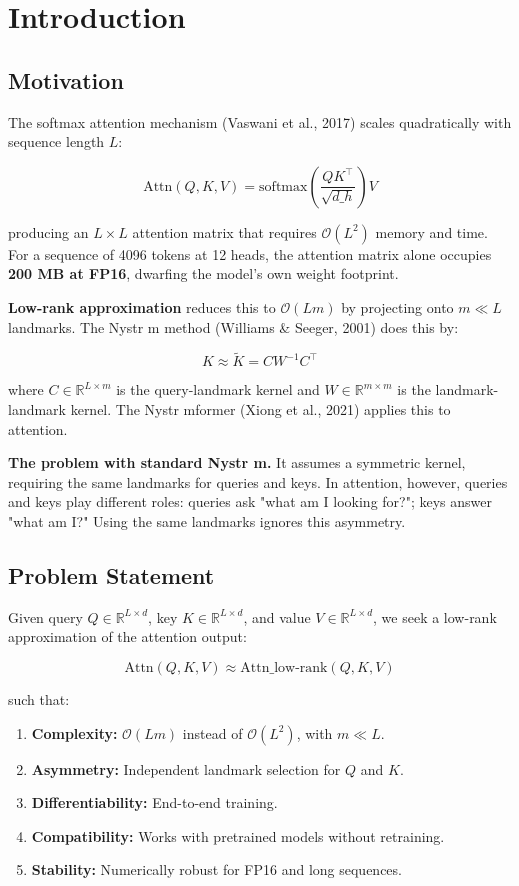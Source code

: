 
\section{Introduction}

\subsection{Motivation}

The softmax attention mechanism (Vaswani et al., 2017) scales quadratically 
with sequence length $L$:

\[
\text{Attn}(Q, K, V) = \text{softmax}\!\left(\frac{Q K^\top}{\sqrt{d\_h}}\right) V
\]

producing an $L \times L$ attention matrix that requires $\mathcal{O}(L^2)$ 
memory and time. For a sequence of 4096 tokens at 12 heads, the attention 
matrix alone occupies \textbf{200 MB at FP16}, dwarfing the model's own weight 
footprint.

\textbf{Low-rank approximation} reduces this to $\mathcal{O}(L m)$ by projecting 
onto $m \ll L$ landmarks. The Nystr m method (Williams \& Seeger, 2001) does 
this by:

\[
K \approx \tilde{K} = C W^{-1} C^\top
\]

where $C \in \mathbb{R}^{L \times m}$ is the query-landmark kernel and 
$W \in \mathbb{R}^{m \times m}$ is the landmark-landmark kernel. The 
Nystr mformer (Xiong et al., 2021) applies this to attention.

\textbf{The problem with standard Nystr m.} It assumes a symmetric kernel, 
requiring the same landmarks for queries and keys. In attention, however, 
queries and keys play different roles: queries ask "what am I looking for?"; 
keys answer "what am I?" Using the same landmarks ignores this asymmetry.

\subsection{Problem Statement}

Given query $Q \in \mathbb{R}^{L \times d}$, key $K \in \mathbb{R}^{L \times d}$, 
and value $V \in \mathbb{R}^{L \times d}$, we seek a low-rank approximation 
of the attention output:

\[
\text{Attn}(Q, K, V) \approx \text{Attn}\_\text{low-rank}(Q, K, V)
\]

such that:

\begin{enumerate}
\item \textbf{Complexity:} $\mathcal{O}(L m)$ instead of $\mathcal{O}(L^2)$, with $m \ll L$.
\item \textbf{Asymmetry:} Independent landmark selection for $Q$ and $K$.
\item \textbf{Differentiability:} End-to-end training.
\item \textbf{Compatibility:} Works with pretrained models without retraining.
\item \textbf{Stability:} Numerically robust for FP16 and long sequences.

\end{enumerate}
